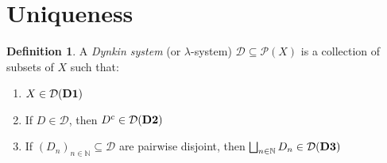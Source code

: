 \documentclass{article}
\theoremstyle{definition}
\newtheorem{definition}{Definition}[section]
\begin{document}
\vspace{3em}
\section{Uniqueness}

\begin{definition}
A \emph{Dynkin system} (or \(\lambda\)-system) \(\mathcal{D} \subseteq \mathcal{P}(X)\) is a collection of subsets of \(X\) such that:
\begin{enumerate}
    \item \(X \in \mathcal{D} \hfill \text{(\textbf{D1})}\)
    \item If \(D \in \mathcal{D}\), then \(D^c \in \mathcal{D} \hfill \text{(\textbf{D2})}\)
    \item If \((D_n)_{n \in \mathbb{N}} \subseteq \mathcal{D}\) are pairwise disjoint, then \(\bigsqcup_{n \in \mathbb{N}} D_n \in \mathcal{D} \hfill \text{(\textbf{D3})}\)
\end{enumerate}
\end{definition}
\end{document}
